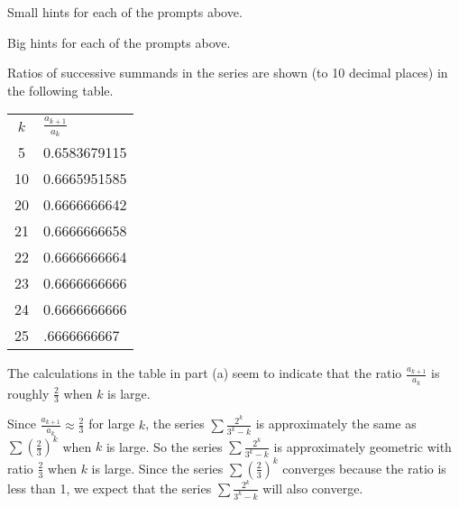 \begin{smallhint}
\ba
	\item Small hints for each of the prompts above.
\ea
\end{smallhint}
\begin{bighint}
\ba
	\item Big hints for each of the prompts above.
\ea
\end{bighint}
\begin{activitySolution}
\ba
	\item Ratios of successive summands in the series are shown (to 10 decimal places) in the following table. 
\begin{center}
\renewcommand{\arraystretch}{1.5}
\begin{tabular}{c|p{2in}}
$k$   & $\frac{a_{k+1}}{a_k}$ \\
5   & 0.6583679115 \\
10   & 0.6665951585 \\
20   & 0.6666666642 \\
21   & 0.6666666658 \\
22   & 0.6666666664  \\
23  & 0.6666666666 \\
24   & 0.6666666666 \\
25   & .6666666667 \\
\end{tabular}
\end{center}
    \item The calculations in the table in part (a) seem to indicate that the ratio $\frac{a_{k+1}}{a_k}$ is roughly $\frac{2}{3}$ when $k$ is large.
    \item Since $\frac{a_{k+1}}{a_k} \approx \frac{2}{3}$ for large $k$, the series $\sum \frac{2^k}{3^k-k}$ is approximately the same as $\sum \left(\frac{2}{3}\right)^k$ when $k$ is large. So the series $\sum \frac{2^k}{3^k-k}$ is approximately geometric with ratio $\frac{2}{3}$ when $k$ is large. Since the series $\sum \left(\frac{2}{3}\right)^k$ converges because the ratio is less than 1, we expect that the series $\sum \frac{2^k}{3^k-k}$ will also converge.
\ea
\end{activitySolution}
\aftera 